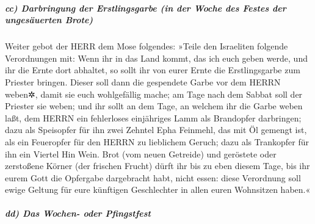 \hypertarget{cc-darbringung-der-erstlingsgarbe-in-der-woche-des-festes-der-ungesuxe4uerten-brote}{%
\subparagraph{cc) Darbringung der Erstlingsgarbe (in der Woche des
Festes der ungesäuerten
Brote)}\label{cc-darbringung-der-erstlingsgarbe-in-der-woche-des-festes-der-ungesuxe4uerten-brote}}

Weiter gebot der HERR dem Mose folgendes:
»Teile den Israeliten folgende Verordnungen mit: Wenn ihr
in das Land kommt, das ich euch geben werde, und ihr die Ernte dort
abhaltet, so sollt ihr von eurer Ernte die Erstlingsgarbe zum Priester
bringen. Dieser soll dann die gespendete Garbe vor dem
HERRN weben✲, damit sie euch wohlgefällig mache; am Tage nach dem Sabbat
soll der Priester sie weben; und ihr sollt an dem Tage,
an welchem ihr die Garbe weben laßt, dem HERRN ein fehlerloses
einjähriges Lamm als Brandopfer darbringen; dazu als
Speisopfer für ihn zwei Zehntel Epha Feinmehl, das mit Öl gemengt ist,
als ein Feueropfer für den HERRN zu lieblichem Geruch; dazu als
Trankopfer für ihn ein Viertel Hin Wein. Brot (vom neuen
Getreide) und geröstete oder zerstoßene Körner (der frischen Frucht)
dürft ihr bis zu eben diesem Tage, bis ihr eurem Gott die Opfergabe
dargebracht habt, nicht essen: diese Verordnung soll ewige Geltung für
eure künftigen Geschlechter in allen euren Wohnsitzen haben.«

\hypertarget{dd-das-wochen--oder-pfingstfest}{%
\subparagraph{dd) Das Wochen- oder
Pfingstfest}\label{dd-das-wochen--oder-pfingstfest}}

